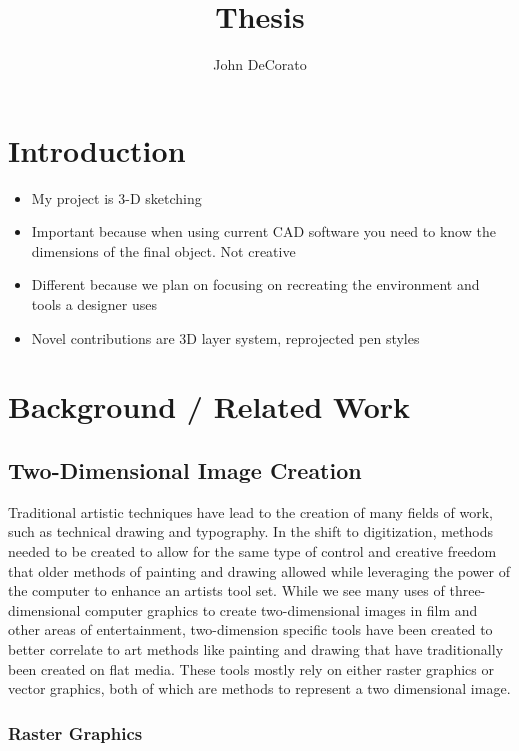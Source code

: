\documentclass[12pt]{report}
\title{Thesis}
\author{John DeCorato}
\date{ }
\begin{document}
 
\maketitle
 
\tableofcontents

\pagebreak
\chapter{Introduction}

\begin{itemize}
	\item My project is 3-D sketching
	\item Important because when using current CAD software you need to know the dimensions of the final object. Not creative
	\item Different because we plan on focusing on recreating the environment and tools a designer uses
	\item Novel contributions are 3D layer system, reprojected pen styles 
\end{itemize}

\pagebreak
\chapter{Background / Related Work}

\section{Two-Dimensional Image Creation}

Traditional artistic techniques have lead to the creation of many fields of work, such as technical drawing and typography. 
In the shift to digitization, methods needed to be created to allow for the same type of control and creative freedom that older methods of painting and drawing allowed while leveraging the power of the computer to enhance an artists tool set.
While we see many uses of three-dimensional computer graphics to create two-dimensional images in film and other areas of entertainment, two-dimension specific tools have been created to better correlate to art methods like painting and drawing that have traditionally been created on flat media.
These tools mostly rely on either raster graphics or vector graphics, both of which are methods to represent a two dimensional image. 

\pagebreak
\subsection{Raster Graphics}
\end{document}
